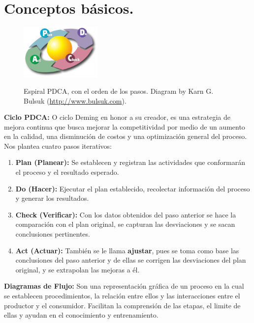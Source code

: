 \documentclass[spanish, fleqn]{article}
\begin{document}
	\section{Conceptos básicos.} 
	\begin{figure}
		\begin{center}
			\vspace{-0.5cm}
			\includegraphics[width=150px]{DPCA.png}
		\end{center}
		Espiral PDCA, con el orden de los pasos.
		Diagram by Karn G. Bulsuk (\url{http://www.bulsuk.com}).
	\end{figure}
	\textbf{Ciclo PDCA:} O ciclo Deming en honor a su creador, es una
	estrategia de mejora continua que busca mejorar la competitividad
	por medio de un aumento en la calidad, una disminución de costos 
	y una optimización general del proceso. Nos plantea cuatro pasos
	iterativos:
	\begin{enumerate}
		\item
			\textbf{Plan (Planear):} Se establecen y registran las actividades
			que conformarán el proceso y el resultado esperado. 
		\item
			\textbf{Do (Hacer):} Ejecutar el plan establecido, recolectar 
			información del proceso y generar los resultados.
		\item
			\textbf{Check (Verificar):} Con los datos obtenidos del paso
			anterior se hace la comparación con el plan original, se capturan
			las desviaciones y se sacan conclusiones pertinentes.
		\item
			\textbf{Act (Actuar):} También se le llama \textbf{ajustar}, pues
			se toma como base las conclusiones del paso anterior y de ellas se 
			corrigen las desviaciones del plan original, y se extrapolan las
			mejoras a él.
	\end{enumerate}
	\vspace{.25cm}
	\textbf{Diagramas de Flujo:} Son una representación gráfica de un proceso en
	la cual se establecen procedimientos, la relación entre ellos y las 
	interacciones entre el productor y el consumidor. Facilitan la comprensión
	de las etapas, el limite de ellas y ayudan en el conocimiento y 
	entrenamiento.\\[.4cm]
\end{document}
